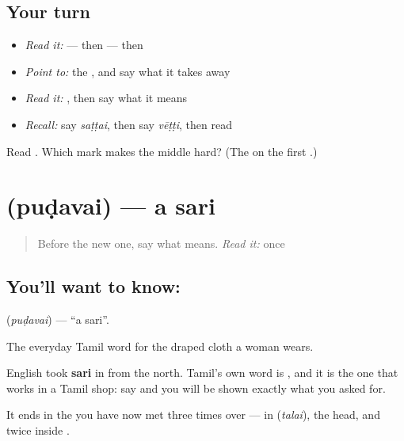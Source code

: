 \subsection*{Your turn}
\begin{itemize}
\raggedright
  \item \emph{Read it:} \textbf{} — then \textbf{} — then \textbf{}
  \item \emph{Point to:} the , and say what it takes away
  \item \emph{Read it:} \textbf{}, then say what it means
  \item \emph{Recall:} say \emph{saṭṭai}, then say \emph{vēṭṭi}, then read \textbf{}
\end{itemize}

\begin{tcolorbox}[breakable,colback=teal!4,colframe=teal!35!black,title={Before you move on}]
Read \textbf{}. Which mark makes the middle hard? (The \textbf{} on the first .)
\end{tcolorbox}
\section[\texorpdfstring{\ta{புடவை} (puḍavai)}{புடவை (puḍavai)}]{ (puḍavai) — a sari}

\label{lesson:TA-C67-sari}



\begin{quote}
Before the new one, say what \textbf{} means. \emph{Read it:} \textbf{} once
\end{quote}

\subsection*{You'll want to know: }
\textbf{} (\emph{puḍavai}) — \textquotedblleft{}a sari\textquotedblright{}.

The everyday Tamil word for the draped cloth a woman wears.

English took \textbf{sari} in from the north. Tamil's own word is , and it is the one that works in a Tamil shop: say  and you will be shown exactly what you asked for.

It ends in the \textbf{} you have now met three times over — in  (\emph{talai}), the head, and twice inside .

